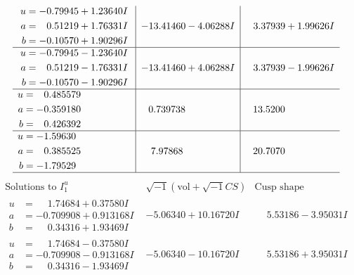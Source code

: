 \documentclass[1p]{elsarticle_modified}
\theoremstyle{definition}
\newcommand{\I}{\sqrt{-1}}
\begin{document}
$$\begin{array}{c|c|c}
\begin{aligned}
u &= -0.79945 + 1.23640 I \\
a &= \phantom{-}0.51219 + 1.76331 I \\
b &= -0.10570 + 1.90296 I\end{aligned}
 & -13.41460 - 4.06288 I & \phantom{-}3.37939 + 1.99626 I \\ \hline\begin{aligned}
u &= -0.79945 - 1.23640 I \\
a &= \phantom{-}0.51219 - 1.76331 I \\
b &= -0.10570 - 1.90296 I\end{aligned}
 & -13.41460 + 4.06288 I & \phantom{-}3.37939 - 1.99626 I \\ \hline\begin{aligned}
u &= \phantom{-}0.485579\phantom{ +0.000000I} \\
a &= -0.359180\phantom{ +0.000000I} \\
b &= \phantom{-}0.426392\phantom{ +0.000000I}\end{aligned}
 & \phantom{-}0.739738\phantom{ +0.000000I} & \phantom{-}13.5200\phantom{ +0.000000I} \\ \hline\begin{aligned}
u &= -1.59630\phantom{ +0.000000I} \\
a &= \phantom{-}0.385525\phantom{ +0.000000I} \\
b &= -1.79529\phantom{ +0.000000I}\end{aligned}
 & \phantom{-}7.97868\phantom{ +0.000000I} & \phantom{-}20.7070\phantom{ +0.000000I}\\
 \hline 
 \end{array}$$\newpage$$\begin{array}{c|c|c}  
\text{Solutions to }I^u_{1}& \I (\text{vol} + \sqrt{-1}CS) & \text{Cusp shape}\\
 \hline 
\begin{aligned}
u &= \phantom{-}1.74684 + 0.37580 I \\
a &= -0.709908 + 0.913168 I \\
b &= \phantom{-}0.34316 + 1.93469 I\end{aligned}
 & -5.06340 + 10.16720 I & \phantom{-}5.53186 - 3.95031 I \\ \hline\begin{aligned}
u &= \phantom{-}1.74684 - 0.37580 I \\
a &= -0.709908 - 0.913168 I \\
b &= \phantom{-}0.34316 - 1.93469 I\end{aligned}
 & -5.06340 - 10.16720 I & \phantom{-}5.53186 + 3.95031 I \\ \hline\begin{aligned}

\end{aligned}
\end{array}$$
\end{document}
